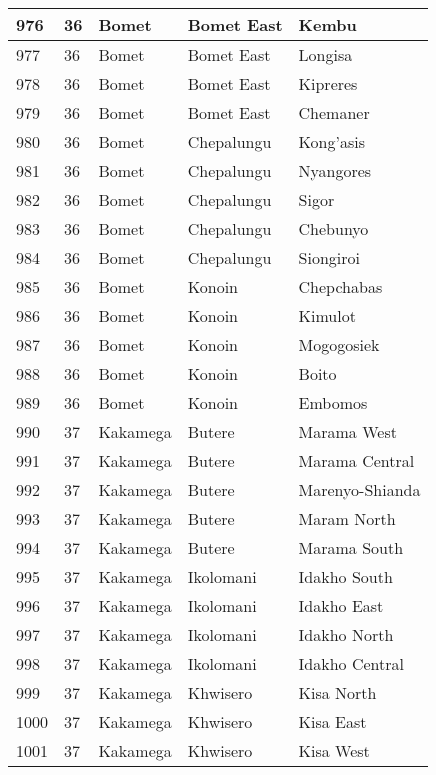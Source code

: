 \begin{table}[!ht]
\begin{tabular}{|l|l|l|l|l|}
        976 & 36 & Bomet & Bomet East & Kembu \\ \hline
        977 & 36 & Bomet & Bomet East & Longisa \\ \hline
        978 & 36 & Bomet & Bomet East & Kipreres \\ \hline
        979 & 36 & Bomet & Bomet East & Chemaner \\ \hline
        980 & 36 & Bomet & Chepalungu & Kong’asis \\ \hline
        981 & 36 & Bomet & Chepalungu & Nyangores \\ \hline
        982 & 36 & Bomet & Chepalungu & Sigor \\ \hline
        983 & 36 & Bomet & Chepalungu & Chebunyo \\ \hline
        984 & 36 & Bomet & Chepalungu & Siongiroi \\ \hline
        985 & 36 & Bomet & Konoin & Chepchabas \\ \hline
        986 & 36 & Bomet & Konoin & Kimulot \\ \hline
        987 & 36 & Bomet & Konoin & Mogogosiek \\ \hline
        988 & 36 & Bomet & Konoin & Boito \\ \hline
        989 & 36 & Bomet & Konoin & Embomos \\ \hline
        990 & 37 & Kakamega & Butere & Marama West \\ \hline
        991 & 37 & Kakamega & Butere & Marama Central \\ \hline
        992 & 37 & Kakamega & Butere & Marenyo-Shianda \\ \hline
        993 & 37 & Kakamega & Butere & Maram North \\ \hline
        994 & 37 & Kakamega & Butere & Marama South \\ \hline
        995 & 37 & Kakamega & Ikolomani & Idakho South \\ \hline
        996 & 37 & Kakamega & Ikolomani & Idakho East \\ \hline
        997 & 37 & Kakamega & Ikolomani & Idakho North \\ \hline
        998 & 37 & Kakamega & Ikolomani & Idakho Central \\ \hline
        999 & 37 & Kakamega & Khwisero & Kisa North \\ \hline
        1000 & 37 & Kakamega & Khwisero & Kisa East \\ \hline
        1001 & 37 & Kakamega & Khwisero & Kisa West \\ \hline

\end{tabular}
\end{table}
